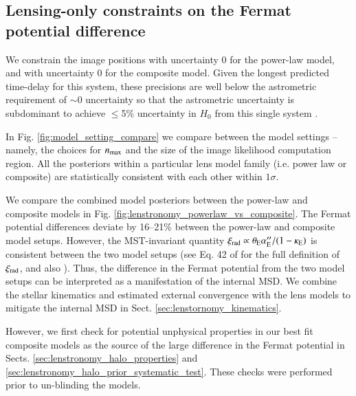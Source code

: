 \documentclass[longauth]{aa}
\newcommand{\ajs}[1]{{{#1}}}
\newcommand{\ajsii}[1]{{{#1}}}
\newcommand{\reply}[1]{{{#1}}}
\begin{document}
\subsection{Lensing-only constraints on the Fermat potential difference} \label{sec:lenstronomy_lensing_results}

\reply{We constrain the image positions with uncertainty 0\farcs002 for the power-law model, and with uncertainty 0\farcs004 for the composite model. Given the longest predicted time-delay for this system, these precisions are well below the astrometric requirement of $\sim$0\farcs02 uncertainty so that the astrometric uncertainty is subdominant to achieve $\leq$5\% uncertainty in $H_0$  from this single system \citep{Birrer19}.}

In Fig. \ref{fig:model_setting_compare} we compare between the model settings -- namely, the choices for $n_{\rm max}$ and the size of the image likelihood computation region. All the posteriors within a particular lens model family (i.e. power law or composite) are statistically consistent with each other within $1\sigma$.

We compare the combined model posteriors between the power-law and composite models in Fig. \ref{fig:lenstronomy_powerlaw_vs_composite}. The Fermat potential differences deviate by 16--21\% between the power-law and composite model setups. However, the MST-invariant quantity $\xi_{\rm rad} \propto \theta_{\rm E} \alpha^{\prime\prime}_{\rm E} / (1 - \kappa_{\rm E})$ is consistent between the two model setups (see Eq. 42 of \citealt{Birrer21} for the full definition of $\xi_{\rm rad}$, and also \citealt{Kochanek20}). Thus, the difference in the Fermat potential from the two model setups can be interpreted as a manifestation of the internal MSD. We combine the stellar kinematics and estimated external convergence with the lens models to mitigate the internal MSD in Sect. \ref{sec:lenstornomy_kinematics}.

\ajs{However, we first check for potential unphysical properties in our best fit composite models as the source of the large difference in the Fermat potential in Sects. \ref{sec:lenstronomy_halo_properties} and \ref{sec:lenstronomy_halo_prior_systematic_test}.} \ajsii{These checks were performed prior to un-blinding the models.}
\end{document}
